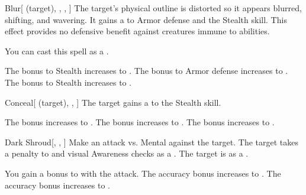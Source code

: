 \lowercase{\hypertarget{spell:Blur}{}}\label{spell:Blur}
\begin{attuneability}[Rank 1]{\hypertarget{spell:Blur}{Blur}}[ (target), , , ]
The target's physical outline is distorted so it appears blurred, shifting, and wavering.
It gains a   to Armor defense and the Stealth skill.
This effect provides no defensive benefit against creatures immune to  abilities.

You can cast this spell as a .

\rankline
{} The bonus to Stealth increases to .
 The bonus to Armor defense increases to .
 The bonus to Stealth increases to .
\end{attuneability}
\vspace{0.25em}



\lowercase{\hypertarget{spell:Conceal}{}}\label{spell:Conceal}
\begin{attuneability}[Rank 1]{\hypertarget{spell:Conceal}{Conceal}}[ (target), , ]
The target gains a   to the Stealth skill.

\rankline
{} The bonus increases to .
 The bonus increases to .
 The bonus increases to .
\end{attuneability}
\vspace{0.25em}



\lowercase{\hypertarget{spell:Dark Shroud}{}}\label{spell:Dark Shroud}
\begin{freeability}[Rank 1]{\hypertarget{spell:Dark Shroud}{Dark Shroud}}[, , ]
Make an attack vs. Mental against the target.
\hit The target takes a  penalty to  and visual Awareness checks as a .
\crit The target is  as a .

\rankline
{} You gain a  bonus to  with the attack.
 The accuracy bonus increases to .
 The accuracy bonus increases to .
\end{freeability}
\vspace{0.25em}



